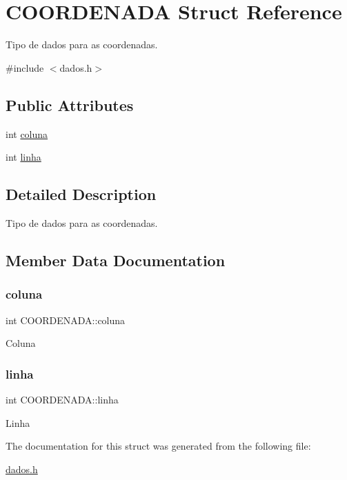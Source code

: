 \hypertarget{structCOORDENADA}{}\section{C\+O\+O\+R\+D\+E\+N\+A\+DA Struct Reference}
\label{structCOORDENADA}


Tipo de dados para as coordenadas.  




{\ttfamily \#include $<$dados.\+h$>$}

\subsection*{Public Attributes}
\begin{DoxyCompactItemize}
\item 
int \hyperlink{structCOORDENADA_adfbc8d4856ce807139fdf62e00aed29a}{coluna}
\item 
int \hyperlink{structCOORDENADA_aefe14bcc5a066ac3b21500cc3d28c06f}{linha}
\end{DoxyCompactItemize}


\subsection{Detailed Description}
Tipo de dados para as coordenadas. 

\subsection{Member Data Documentation}
\mbox{\label{structCOORDENADA_adfbc8d4856ce807139fdf62e00aed29a}} 
\subsubsection{\texorpdfstring{coluna}{coluna}}
{\footnotesize\ttfamily int C\+O\+O\+R\+D\+E\+N\+A\+D\+A\+::coluna}

Coluna \mbox{\label{structCOORDENADA_aefe14bcc5a066ac3b21500cc3d28c06f}} 
\subsubsection{\texorpdfstring{linha}{linha}}
{\footnotesize\ttfamily int C\+O\+O\+R\+D\+E\+N\+A\+D\+A\+::linha}

Linha 

The documentation for this struct was generated from the following file\+:\begin{DoxyCompactItemize}
\item 
\hyperlink{dados_8h}{dados.\+h}\end{DoxyCompactItemize}
